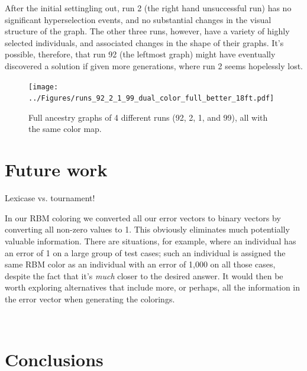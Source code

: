 \documentclass{sig-alternate}
\begin{document}
After the initial settingling out, run 2 (the right hand unsuccessful run) has no
significant hyperselection events, and no substantial changes in the visual structure of
the graph. The other three runs, however, have a variety of highly selected individuals,
and associated changes in the shape of their graphs. It's possible, therefore, that run
92 (the leftmost graph) might have eventually discovered a solution if given more generations,
where run 2 seems hopelessly lost.

\begin{figure}[tb]
	\begin{center}
		\texttt{[image: ../Figures/runs\_92\_2\_1\_99\_dual\_color\_full\_better\_18ft.pdf]}
	\end{center}
	\caption{Full ancestry graphs of 4 different runs (92, 2, 1, and 99), all with the same color map.}
	\label{fig:runs92:2:1:99:filtered}
\end{figure}

\section{Future work}
\label{sec:futurework}

Lexicase vs. tournament!

In our RBM coloring we converted all our error vectors to binary vectors by
converting all non-zero values to 1. This obviously eliminates much potentially
valuable information. There are situations, for example, where an individual has
an error of 1 on a large group of test cases; such an individual is assigned
the same RBM color as an individual with an error of 1,000 on all those cases,
despite the fact that it's \emph{much} closer to the desired answer.
It would then be worth exploring alternatives that include more, or perhaps, 
all the information in the error vector when generating the colorings.

\

\section{Conclusions}
\label{sec:conclusions}

%
%



\end{document}
